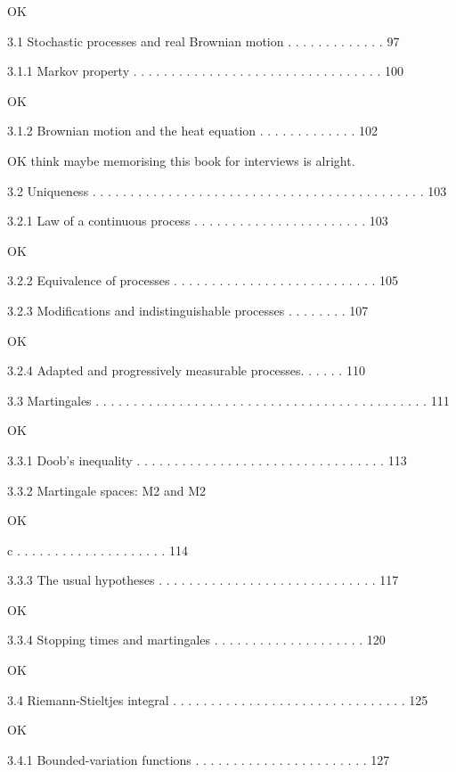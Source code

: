 OK

3.1 Stochastic processes and real Brownian motion . . . . . . . . . . . . . 97



3.1.1 Markov property . . . . . . . . . . . . . . . . . . . . . . . . . . . . . . . . . 100

OK

3.1.2 Brownian motion and the heat equation . . . . . . . . . . . . . 102

OK think maybe memorising this book for interviews is alright.

3.2 Uniqueness . . . . . . . . . . . . . . . . . . . . . . . . . . . . . . . . . . . . . . . . . . . . 103



3.2.1 Law of a continuous process . . . . . . . . . . . . . . . . . . . . . . . 103

OK

3.2.2 Equivalence of processes . . . . . . . . . . . . . . . . . . . . . . . . . . . 105



3.2.3 Modifications and indistinguishable processes . . . . . . . . 107

OK

3.2.4 Adapted and progressively measurable processes. . . . . . 110



3.3 Martingales . . . . . . . . . . . . . . . . . . . . . . . . . . . . . . . . . . . . . . . . . . . . 111

OK

3.3.1 Doob's inequality . . . . . . . . . . . . . . . . . . . . . . . . . . . . . . . . . 113



3.3.2 Martingale spaces: M2 and M2

OK

c . . . . . . . . . . . . . . . . . . . . 114



3.3.3 The usual hypotheses . . . . . . . . . . . . . . . . . . . . . . . . . . . . . 117

OK

3.3.4 Stopping times and martingales . . . . . . . . . . . . . . . . . . . . 120

OK

3.4 Riemann-Stieltjes integral . . . . . . . . . . . . . . . . . . . . . . . . . . . . . . . 125

OK

3.4.1 Bounded-variation functions . . . . . . . . . . . . . . . . . . . . . . . 127

